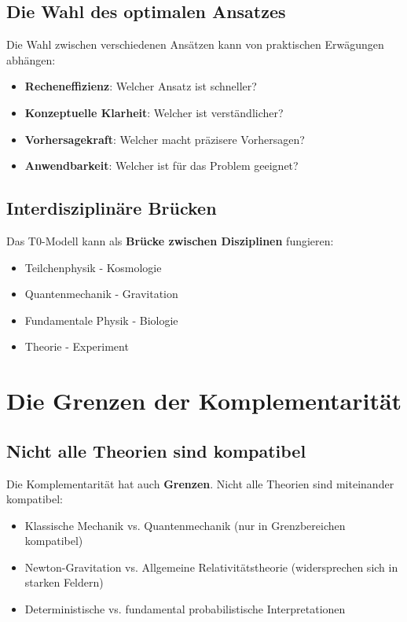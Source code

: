 \documentclass[12pt,a4paper]{report}
\begin{document}
	\subsection{Die Wahl des optimalen Ansatzes}
	
	Die Wahl zwischen verschiedenen Ansätzen kann von praktischen Erwägungen abhängen:
	
	\begin{itemize}
		\item \textbf{Recheneffizienz}: Welcher Ansatz ist schneller?
		\item \textbf{Konzeptuelle Klarheit}: Welcher ist verständlicher?
		\item \textbf{Vorhersagekraft}: Welcher macht präzisere Vorhersagen?
		\item \textbf{Anwendbarkeit}: Welcher ist für das Problem geeignet?
	\end{itemize}
	
	\subsection{Interdisziplinäre Brücken}
	
	Das T0-Modell kann als \textbf{Brücke zwischen Disziplinen} fungieren:
	
	\begin{itemize}
		\item Teilchenphysik - Kosmologie
		\item Quantenmechanik - Gravitation
		\item Fundamentale Physik - Biologie
		\item Theorie - Experiment
	\end{itemize}
	
	\section{Die Grenzen der Komplementarität}
	
	\subsection{Nicht alle Theorien sind kompatibel}
	
	Die Komplementarität hat auch \textbf{Grenzen}. Nicht alle Theorien sind miteinander kompatibel:
	
	\begin{itemize}
		\item Klassische Mechanik vs. Quantenmechanik (nur in Grenzbereichen kompatibel)
		\item Newton-Gravitation vs. Allgemeine Relativitätstheorie (widersprechen sich in starken Feldern)
		\item Deterministische vs. fundamental probabilistische Interpretationen
	\end{itemize}
	
\end{document}
